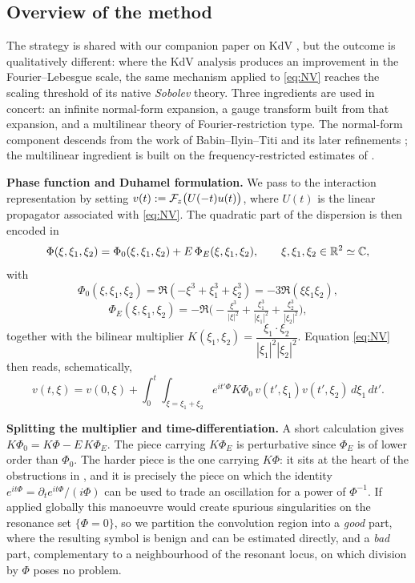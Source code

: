 \subsection{Overview of the method}

The strategy is shared with our companion paper on KdV \cite{chcora}, but the outcome is qualitatively different: where the KdV analysis produces an improvement in the Fourier--Lebesgue scale, the same mechanism applied to \eqref{eq:NV} reaches the scaling threshold of its native \emph{Sobolev} theory. Three ingredients are used in concert: an infinite normal-form expansion, a gauge transform built from that expansion, and a multilinear theory of Fourier-restriction type. The normal-form component descends from the work of Babin--Ilyin--Titi \cite{bit} and its later refinements \cite{GKO13, KOY20, OW21, Kishimoto22}; the multilinear ingredient is built on the frequency-restricted estimates of \cite{COS}.

\medskip

\textbf{Phase function and Duhamel formulation.}
We pass to the interaction representation by setting $v(t):=\mathcal{F}_z\big(U(-t)u(t)\big)$, where $U(t)$ is the linear propagator associated with \eqref{eq:NV}. The quadratic part of the dispersion is then encoded in
\[
\Phi(\xi,\xi_1,\xi_2)=\Phi_0(\xi,\xi_1,\xi_2)+E\,\Phi_E(\xi,\xi_1,\xi_2),\qquad \xi,\xi_1,\xi_2\in\mathbb{R}^2\simeq\mathbb{C},
\]
with
\[
\Phi_0(\xi,\xi_1,\xi_2)=\Re(-\xi^3+\xi_1^3+\xi_2^3)=-3\Re(\xi\xi_1\xi_2),
\]
\[
\Phi_E(\xi,\xi_1,\xi_2)=-\Re\Big(-\tfrac{\xi^3}{|\xi|^2}+\tfrac{\xi_1^3}{|\xi_1|^2}+\tfrac{\xi_2^3}{|\xi_2|^2}\Big),
\]
together with the bilinear multiplier $K(\xi_1,\xi_2)=\dfrac{\xi_1\cdot\xi_2}{|\xi_1|^2|\xi_2|^2}$. Equation \eqref{eq:NV} then reads, schematically,
\begin{equation}\label{eq:NV2}
		v(t,\xi)=v(0,\xi)+\int_0^t \!\!\!\int_{\xi=\xi_1+\xi_2} \!\!\! e^{it'\Phi}K\Phi_0\,v(t',\xi_1)v(t',\xi_2)\,d\xi_1\,dt'.
\end{equation}

\medskip

\textbf{Splitting the multiplier and time-differentiation.}
A short calculation gives $K\Phi_0=K\Phi-E\,K\Phi_E$. The piece carrying $K\Phi_E$ is perturbative since $\Phi_E$ is of lower order than $\Phi_0$. The harder piece is the one carrying $K\Phi$: it sits at the heart of the obstructions in \cite{kazeykinamunoz1,kazeykinamunoz2,angelopolous,adamsgrunrock}, and it is precisely the piece on which the identity $e^{it\Phi}=\partial_t e^{it\Phi}/(i\Phi)$ can be used to trade an oscillation for a power of $\Phi^{-1}$. If applied globally this manoeuvre would create spurious singularities on the resonance set $\{\Phi=0\}$, so we partition the convolution region into a \emph{good} part, where the resulting symbol is benign and can be estimated directly, and a \emph{bad} part, complementary to a neighbourhood of the resonant locus, on which division by $\Phi$ poses no problem.

